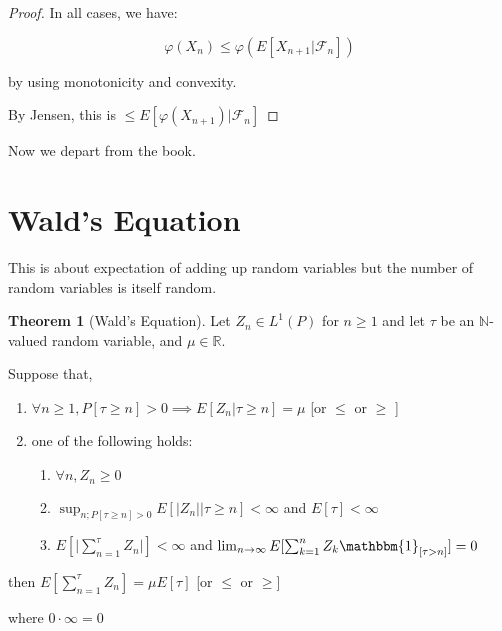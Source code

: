 \documentclass{article}
\theoremstyle{definition}
\newtheorem{theorem}{Theorem}
\begin{document}
\begin{proof}
    In all cases, we have:

    \[
        \varphi(X_n) \leq \varphi(E[X_{n+1}|\mathscr{F}_n])
    \]

    by using monotonicity and convexity.

    By Jensen, this is \(\leq E[\varphi(X_{n+1})|\mathscr{F}_n]\) 
\end{proof}

Now we depart from the book.

\section*{Wald's Equation}

This is about expectation of adding up random variables but the number of random variables is itself random.

\begin{theorem}
    [Wald's Equation]

    Let \(Z_n \in L^1(P)\) for \(n\geq 1\) and let \(\tau\) be an \(\mathbb{N}\)-valued random variable, and \(\mu\in\mathbb{R}\).

    Suppose that,

    \begin{enumerate}
        \item \(\forall n \geq 1, P[\tau \geq n]>0 \implies E[Z_n|\tau\geq n]=\mu\) [or \(\leq\) or \(\geq\)  ]
        \item one of the following holds:
            \begin{enumerate}
                \item \(\forall n, Z_n \geq 0\) 
                \item \(\sup_{n;P[\tau\geq n]>0}E[\vert Z_n \vert | \tau \geq n]<\infty\) and \(E[\tau]<\infty\)  
                \item \(E[\vert \sum_{n=1}^{\tau} Z_n  \vert ]<\infty\) and \(\lim_{n \to \infty} E[\sum_{k=1}^n Z_k \mathbbm{1}_{[\tau > n]}]=0\)  
            \end{enumerate}
    \end{enumerate}

    then \(E[\sum_{n=1}^{\tau} Z_n]=\mu E[\tau]\) [or \(\leq\) or \(\geq\)]

    where \(0\cdot \infty = 0\) 

\end{theorem}
\end{document}
